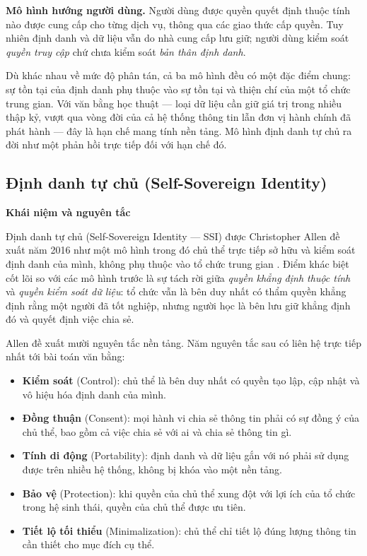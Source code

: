 \textbf{Mô hình hướng người dùng.} Người dùng được quyền quyết định thuộc tính nào được cung cấp cho từng dịch vụ, thông qua các giao thức cấp quyền. Tuy nhiên định danh và dữ liệu vẫn do nhà cung cấp lưu giữ; người dùng kiểm soát \emph{quyền truy cập} chứ chưa kiểm soát \emph{bản thân định danh}.

Dù khác nhau về mức độ phân tán, cả ba mô hình đều có một đặc điểm chung: sự tồn tại của định danh phụ thuộc vào sự tồn tại và thiện chí của một tổ chức trung gian. Với văn bằng học thuật --- loại dữ liệu cần giữ giá trị trong nhiều thập kỷ, vượt qua vòng đời của cả hệ thống thông tin lẫn đơn vị hành chính đã phát hành --- đây là hạn chế mang tính nền tảng. Mô hình định danh tự chủ ra đời như một phản hồi trực tiếp đối với hạn chế đó.

\subsection{Định danh tự chủ (Self-Sovereign Identity)}

\noindent \textbf{Khái niệm và nguyên tắc}

Định danh tự chủ (Self-Sovereign Identity --- SSI) được Christopher Allen đề xuất năm 2016 như một mô hình trong đó chủ thể trực tiếp sở hữu và kiểm soát định danh của mình, không phụ thuộc vào tổ chức trung gian \cite{Allen2016}. Điểm khác biệt cốt lõi so với các mô hình trước là sự tách rời giữa \emph{quyền khẳng định thuộc tính} và \emph{quyền kiểm soát dữ liệu}: tổ chức vẫn là bên duy nhất có thẩm quyền khẳng định rằng một người đã tốt nghiệp, nhưng người học là bên lưu giữ khẳng định đó và quyết định việc chia sẻ.

Allen đề xuất mười nguyên tắc nền tảng. Năm nguyên tắc sau có liên hệ trực tiếp nhất tới bài toán văn bằng:

\begin{itemize}
    \item \textbf{Kiểm soát} (Control): chủ thể là bên duy nhất có quyền tạo lập, cập nhật và vô hiệu hóa định danh của mình.
    \item \textbf{Đồng thuận} (Consent): mọi hành vi chia sẻ thông tin phải có sự đồng ý của chủ thể, bao gồm cả việc chia sẻ với ai và chia sẻ thông tin gì.
    \item \textbf{Tính di động} (Portability): định danh và dữ liệu gắn với nó phải sử dụng được trên nhiều hệ thống, không bị khóa vào một nền tảng.
    \item \textbf{Bảo vệ} (Protection): khi quyền của chủ thể xung đột với lợi ích của tổ chức trong hệ sinh thái, quyền của chủ thể được ưu tiên.
    \item \textbf{Tiết lộ tối thiểu} (Minimalization): chủ thể chỉ tiết lộ đúng lượng thông tin cần thiết cho mục đích cụ thể.
\end{itemize}

